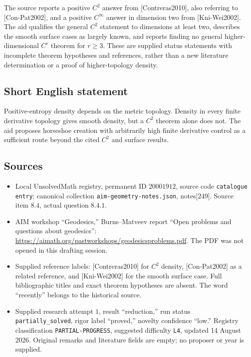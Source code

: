 \documentclass[11pt]{article}
\begin{document}
The source reports a positive \(C^2\) answer from [Contreras2010], also referring to [Con-Pat2002], and a positive \(C^\infty\) answer in dimension two from [Kni-Wei2002]. The aid qualifies the general \(C^2\) statement to dimensions at least two, describes the smooth surface cases as largely known, and reports finding no general higher-dimensional \(C^r\) theorem for \(r\geq3\). These are supplied status statements with incomplete theorem hypotheses and references, rather than a new literature determination or a proof of higher-topology density.
\subsection{Short English statement}
Positive-entropy density depends on the metric topology. Density in every finite derivative topology gives smooth density, but a \(C^2\) theorem alone does not. The aid proposes horseshoe creation with arbitrarily high finite derivative control as a sufficient route beyond the cited \(C^2\) and surface results.
\subsection{Sources}
\begin{itemize}
\item Local UnsolvedMath registry, permanent ID \(20001912\), source code \texttt{catalogue entry}; canonical collection \texttt{aim-geometry-notes.json}, notes[249]. Source item \(8.4\), actual question \(8.4.1\).
\item AIM workshop ``Geodesics,'' Burns--Matveev report ``Open problems and questions about geodesics'': \url{https://aimath.org/pastworkshops/geodesicsproblems.pdf}. The PDF was not opened in this drafting session.
\item Supplied reference labels: [Contreras2010] for \(C^2\) density, [Con-Pat2002] as a related reference, and [Kni-Wei2002] for the smooth surface case. Full bibliographic titles and exact theorem hypotheses are absent. The word ``recently'' belongs to the historical source.
\item Supplied research attempt \(1\), result ``reduction,'' run status \texttt{partially\_solved}, rigor label ``proved,'' novelty confidence ``low.'' Registry classification \texttt{PARTIAL-PROGRESS}, suggested difficulty \texttt{L4}, updated 14 August 2026. Original remarks and literature fields are empty; no proposer or year is supplied.
\end{itemize}
\end{document}
